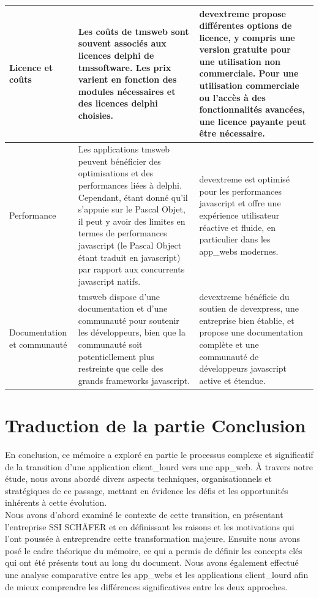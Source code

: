 \documentclass[a4paper, 12pt, french]{article}
\begin{document}
\begin{landscape}
\begin{longtable}[c]{p{3cm}|p{8.5cm}|p{8.5cm}}
						\hline
						Licence et coûts & Les coûts de \gls{tmsweb} sont souvent associés aux licences \gls{delphi} de \gls{tmssoftware}. Les prix varient en fonction des modules nécessaires et des licences \gls{delphi} choisies. & \gls{devextreme} propose différentes options de licence, y compris une version gratuite pour une utilisation non commerciale. Pour une utilisation commerciale ou l'accès à des fonctionnalités avancées, une licence payante peut être nécessaire.\\
						\hline
						Performance & Les applications \gls{tmsweb} peuvent bénéficier des optimisations et des performances liées à \gls{delphi}. Cependant, étant donné qu'il s'appuie sur le Pascal Objet, il peut y avoir des limites en termes de performances \gls{javascript} (le Pascal Object étant traduit en \gls{javascript}) par rapport aux concurrents \gls{javascript} natifs. & \gls{devextreme} est optimisé pour les performances \gls{javascript} et offre une expérience utilisateur réactive et fluide, en particulier dans les \glspl{app_web} modernes.\\
						\hline
						Documentation et communauté & \gls{tmsweb} dispose d'une documentation et d'une communauté pour soutenir les développeurs, bien que la communauté soit potentiellement plus restreinte que celle des grands \glspl{framework} \gls{javascript}. & \gls{devextreme} bénéficie du soutien de \gls{devexpress}, une entreprise bien établie, et propose une documentation complète et une communauté de développeurs \gls{javascript} active et étendue.\\
				\bottomrule	
			\end{longtable}
		\end{landscape}
		\newpage

		\section{Traduction de la partie Conclusion}\label{appendix:conclusion_translation}
			En conclusion, ce mémoire a exploré en partie le processus complexe et significatif de la transition d'une application \gls{client_lourd} vers une \gls{app_web}. À travers notre étude, nous avons abordé divers aspects techniques, organisationnels et stratégiques de ce passage, mettant en évidence les défis et les opportunités inhérents à cette évolution.\\

		Nous avons d'abord examiné le contexte de cette transition, en présentant l'entreprise SSI SCHÄFER et en définissant les raisons et les motivations qui l'ont poussée à entreprendre cette transformation majeure. Ensuite nous avons posé le cadre théorique du mémoire, ce qui a permis de définir les concepts clés qui ont été présents tout au long du document. Nous avons également effectué une analyse comparative entre les \glspl{app_web} et les applications \gls{client_lourd} afin de mieux comprendre les différences significatives entre les deux approches.\\
\end{document}
